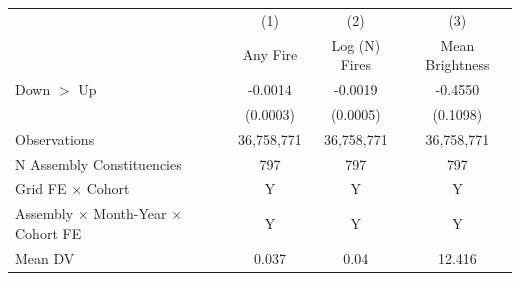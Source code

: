 \begin{tabular}{lccc}
\tabularnewline \hline
& (1) & (2) & (3)\\
& Any Fire & Log (N) Fires & Mean Brightness\\
\hline

Down $>$ Up &     -0.0014\sym{***}&     -0.0019\sym{***}&     -0.4550\sym{***}\\
            &    (0.0003)         &    (0.0005)         &    (0.1098)         \\
\hline
Observations&  36,758,771         &  36,758,771         &  36,758,771         \\
N Assembly Constituencies&         797         &         797         &         797         \\
Grid FE $\times$ Cohort&           Y         &           Y         &           Y         \\
Assembly $\times$ Month-Year $\times$ Cohort FE&           Y         &           Y         &           Y         \\
Mean DV     &       0.037         &        0.04         &      12.416         \\
\hline
\end{tabular}
